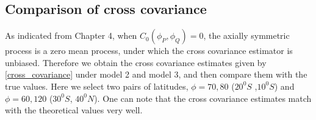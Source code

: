 \subsection{\bf Comparison of cross covariance}

As indicated from Chapter 4, when $C_0(\phi_P, \phi_Q) = 0$, the axially symmetric process is a zero mean process, under which the cross covariance estimator is unbiased. Therefore we obtain the cross covariance estimates given by \eqref{cross_covariance} under model 2 and model 3, and then compare them with the true values. Here we select two pairs of latitudes, $\phi = 70, 80$ ($20^0S$ ,$10^0S$) and $\phi = 60, 120$ ($30^0S$, $40^0N$). One can note that the cross covariance estimates match with the theoretical values very well.


% 
% 

